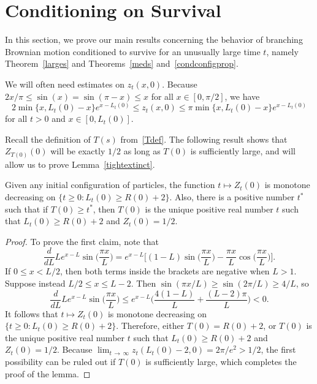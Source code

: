 \documentclass[AHL,Unicode,longabstracts,published]{cedram}
\newcommand{\1} {\mathds{1}}
\begin{document}
\section{Conditioning on Survival}\label{18sec}

In this section, we prove our main results concerning the behavior of branching Brownian motion conditioned to survive for an unusually large time $t$, namely Theorem~\ref{larges} and Theorems~\ref{meds} and~\ref{condconfigprop}.

We will often need estimates on $z_t(x,0)$. Because $2x/\pi \leq \sin(x) = \sin(\pi - x) \leq x$ for all $x \in [0, \pi/2]$, we have
\begin{equation}\label{detzbound}
2 \min\{x, L_t(0) - x\} e^{x - L_t(0)} \leq z_t(x,0) \leq \pi \min\{x, L_t(0) - x\} e^{x - L_t(0)}
\end{equation}
for all $t > 0$ and $x \in [0, L_t(0)]$.

Recall the definition of $T(s)$ from~\eqref{Tdef}. The following result shows that $Z_{T(0)}(0)$ will be exactly $1/2$ as long as $T(0)$ is sufficiently large, and will allow us to prove Lemma~\ref{tightextinct}.

\begin{lemm}\label{monotone}
Given any initial configuration of particles, the function $t \mapsto Z_t(0)$ is monotone decreasing on $\{t\ge0:L_t(0) \ge R(0) + 2\}$. Also, there is a positive number $t^*$ such that if $T(0) \geq t^*$, then $T(0)$ is the unique positive real number $t$ such that $L_t(0) \geq R(0) + 2$ and $Z_t(0) = 1/2$.
\end{lemm}

\begin{proof}
To prove the first claim, note that
\[
\frac{d}{dL} L e^{x-L} \sin \bigg(\frac{\pi x}{L} \bigg) = e^{x-L} \bigg[(1 - L) \sin \bigg(\frac{\pi x}{L} \bigg) - \frac{\pi x}{L} \cos \bigg(\frac{\pi x}{L} \bigg) \bigg].
\]
If $0 \leq x < L/2$, then both terms inside the brackets are negative when $L > 1$. Suppose instead $L/2 \leq x \leq L - 2$. Then $\sin(\pi x/L) \geq \sin(2 \pi/L) \geq 4/L$, so
\[
\frac{d}{dL} L e^{x-L} \sin \bigg(\frac{\pi x}{L} \bigg) \leq e^{x-L} \bigg(\frac{4 (1 - L)}{L} + \frac{(L-2) \pi}{L} \bigg) < 0.
\]
It follows that $t \mapsto Z_t(0)$ is monotone decreasing on $\{t\ge0:L_t(0) \ge R(0) + 2\}$. Therefore, either $T(0) = R(0) + 2$, or $T(0)$ is the unique positive real number $t$ such that $L_t(0) \geq R(0) + 2$ and $Z_t(0) = 1/2$. Because $\lim_{t\, \rightarrow\,\infty} z_t(L_t(0) - 2, 0) = 2 \pi/e^2 > 1/2$, the first possibility can be ruled out if $T(0)$ is sufficiently large, which completes the proof of the lemma.
\end{proof}
\end{document}
